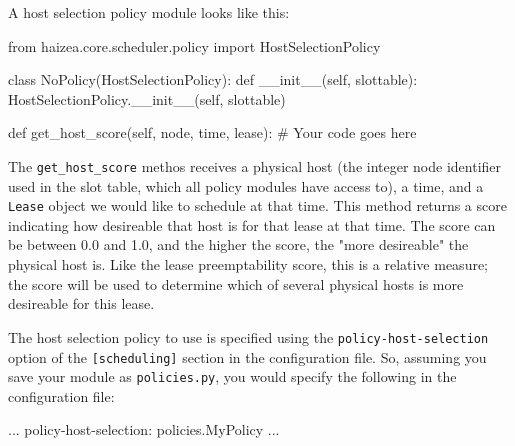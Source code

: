 A host selection policy module looks like this:

\begin{wideshellverbatim}
from haizea.core.scheduler.policy import HostSelectionPolicy

class NoPolicy(HostSelectionPolicy):
    def __init__(self, slottable):
        HostSelectionPolicy.__init__(self, slottable)
    
    
    def get_host_score(self, node, time, lease):       
        # Your code goes here
\end{wideshellverbatim}

The \texttt{get\_host\_score} methos receives a physical host (the integer node identifier used in the slot table, which all policy modules have access to), a time, and a \texttt{Lease} object we would like to schedule at that time. This method returns a score indicating how desireable that host is for that lease at that time. The score can be between 0.0 and 1.0, and the higher the score,       the "more desireable" the physical host is. Like the lease preemptability score, this is a relative measure; the score will be used to determine which of several physical hosts is more desireable for this lease.

The host selection policy to use is specified using the \texttt{policy-host-selection} option of the \texttt{[scheduling]} section in the configuration file. So, assuming you save your module as \texttt{policies.py}, you would specify the following in the configuration file:

\begin{wideshellverbatim}
[scheduling]
...
policy-host-selection: policies.MyPolicy
...
\end{wideshellverbatim}
